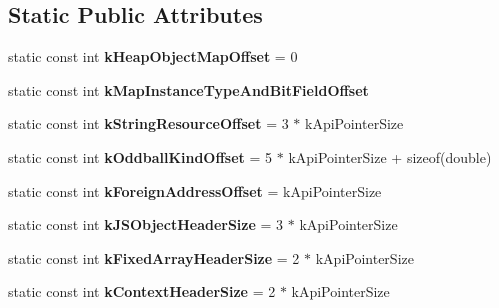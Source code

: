 \subsection*{Static Public Attributes}
\begin{DoxyCompactItemize}
\item 
static const int {\bfseries k\+Heap\+Object\+Map\+Offset} = 0\hypertarget{classv8_1_1internal_1_1_internals_a0902a596b5656b4592157eaacc020512}{}\label{classv8_1_1internal_1_1_internals_a0902a596b5656b4592157eaacc020512}

\item 
static const int {\bfseries k\+Map\+Instance\+Type\+And\+Bit\+Field\+Offset}
\item 
static const int {\bfseries k\+String\+Resource\+Offset} = 3 $\ast$ k\+Api\+Pointer\+Size\hypertarget{classv8_1_1internal_1_1_internals_a8c2b35069864f567ca0c571310dd90a1}{}\label{classv8_1_1internal_1_1_internals_a8c2b35069864f567ca0c571310dd90a1}

\item 
static const int {\bfseries k\+Oddball\+Kind\+Offset} = 5 $\ast$ k\+Api\+Pointer\+Size + sizeof(double)\hypertarget{classv8_1_1internal_1_1_internals_a98685d6861a07139720cd296f94f2b73}{}\label{classv8_1_1internal_1_1_internals_a98685d6861a07139720cd296f94f2b73}

\item 
static const int {\bfseries k\+Foreign\+Address\+Offset} = k\+Api\+Pointer\+Size\hypertarget{classv8_1_1internal_1_1_internals_ad4134449ee39b95e5ac035996aa7d66b}{}\label{classv8_1_1internal_1_1_internals_ad4134449ee39b95e5ac035996aa7d66b}

\item 
static const int {\bfseries k\+J\+S\+Object\+Header\+Size} = 3 $\ast$ k\+Api\+Pointer\+Size\hypertarget{classv8_1_1internal_1_1_internals_af8faf3ff3271d26bafa6ca0ea87e2a57}{}\label{classv8_1_1internal_1_1_internals_af8faf3ff3271d26bafa6ca0ea87e2a57}

\item 
static const int {\bfseries k\+Fixed\+Array\+Header\+Size} = 2 $\ast$ k\+Api\+Pointer\+Size\hypertarget{classv8_1_1internal_1_1_internals_a715ca62a5ddceac28d43c470db067675}{}\label{classv8_1_1internal_1_1_internals_a715ca62a5ddceac28d43c470db067675}

\item 
static const int {\bfseries k\+Context\+Header\+Size} = 2 $\ast$ k\+Api\+Pointer\+Size\hypertarget{classv8_1_1internal_1_1_internals_aa5187d7653158ef851c53594e6e63851}{}\label{classv8_1_1internal_1_1_internals_aa5187d7653158ef851c53594e6e63851}


\end{DoxyCompactItemize}
